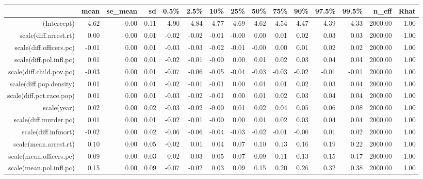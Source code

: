 \begin{table}[ht]
\centering
\begin{tabular}{rrrrrrrrrrrrrrr}
  \hline
 & mean & se\_mean & sd & 0.5\% & 2.5\% & 10\% & 25\% & 50\% & 75\% & 90\% & 97.5\% & 99.5\% & n\_eff & Rhat \\ 
  \hline
(Intercept) & -4.62 & 0.00 & 0.11 & -4.90 & -4.84 & -4.77 & -4.69 & -4.62 & -4.54 & -4.47 & -4.39 & -4.33 & 2000.00 & 1.00 \\ 
  scale(diff.arrest.rt) & 0.00 & 0.00 & 0.01 & -0.02 & -0.02 & -0.01 & -0.00 & 0.00 & 0.01 & 0.02 & 0.03 & 0.03 & 2000.00 & 1.00 \\ 
  scale(diff.officers.pc) & -0.01 & 0.00 & 0.01 & -0.03 & -0.03 & -0.02 & -0.01 & -0.00 & 0.00 & 0.01 & 0.02 & 0.02 & 2000.00 & 1.00 \\ 
  scale(diff.pol.infl.pc) & 0.01 & 0.00 & 0.01 & -0.02 & -0.01 & -0.00 & 0.00 & 0.01 & 0.02 & 0.03 & 0.04 & 0.04 & 2000.00 & 1.00 \\ 
  scale(diff.child.pov.pc) & -0.03 & 0.00 & 0.01 & -0.07 & -0.06 & -0.05 & -0.04 & -0.03 & -0.03 & -0.02 & -0.01 & -0.01 & 2000.00 & 1.00 \\ 
  scale(diff.pop.density) & 0.01 & 0.00 & 0.01 & -0.02 & -0.01 & -0.01 & 0.00 & 0.01 & 0.01 & 0.02 & 0.03 & 0.04 & 2000.00 & 1.00 \\ 
  scale(diff.pct.race.pop) & 0.01 & 0.00 & 0.01 & -0.03 & -0.02 & -0.01 & 0.00 & 0.01 & 0.02 & 0.03 & 0.04 & 0.04 & 2000.00 & 1.00 \\ 
  scale(year) & 0.02 & 0.00 & 0.02 & -0.03 & -0.02 & -0.00 & 0.01 & 0.02 & 0.04 & 0.05 & 0.06 & 0.08 & 2000.00 & 1.00 \\ 
  scale(diff.murder.pc) & 0.01 & 0.00 & 0.01 & -0.02 & -0.01 & -0.00 & 0.00 & 0.01 & 0.02 & 0.03 & 0.04 & 0.04 & 2000.00 & 1.00 \\ 
  scale(diff.infmort) & -0.02 & 0.00 & 0.02 & -0.06 & -0.06 & -0.04 & -0.03 & -0.02 & -0.01 & -0.00 & 0.01 & 0.02 & 2000.00 & 1.00 \\ 
  scale(mean.arrest.rt) & 0.10 & 0.00 & 0.05 & -0.02 & 0.01 & 0.04 & 0.07 & 0.10 & 0.13 & 0.16 & 0.19 & 0.22 & 2000.00 & 1.00 \\ 
  scale(mean.officers.pc) & 0.09 & 0.00 & 0.03 & 0.02 & 0.03 & 0.05 & 0.07 & 0.09 & 0.11 & 0.13 & 0.15 & 0.17 & 2000.00 & 1.00 \\ 
  scale(mean.pol.infl.pc) & 0.15 & 0.00 & 0.09 & -0.07 & -0.02 & 0.03 & 0.09 & 0.15 & 0.20 & 0.26 & 0.32 & 0.38 & 2000.00 & 1.00 \\ 

\end{tabular}
\end{table}
